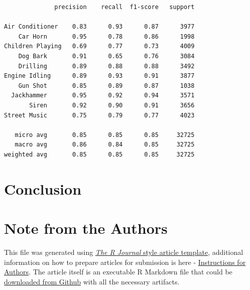\begin{verbatim}
              precision    recall  f1-score   support

Air Conditioner    0.83      0.93      0.87      3977
    Car Horn       0.95      0.78      0.86      1998
Children Playing   0.69      0.77      0.73      4009
    Dog Bark       0.91      0.65      0.76      3084
    Drilling       0.89      0.88      0.88      3492
Engine Idling      0.89      0.93      0.91      3877
    Gun Shot       0.85      0.89      0.87      1038
  Jackhammer       0.95      0.92      0.94      3571
       Siren       0.92      0.90      0.91      3656
Street Music       0.75      0.79      0.77      4023

   micro avg       0.85      0.85      0.85     32725
   macro avg       0.86      0.84      0.85     32725
weighted avg       0.85      0.85      0.85     32725
\end{verbatim}

\hypertarget{conclusion}{%
\section{Conclusion}\label{conclusion}}



\hypertarget{note-from-the-authors}{%
\section{Note from the Authors}\label{note-from-the-authors}}

This file was generated using
\href{https://github.com/rstudio/rticles}{\emph{The R Journal} style
article template}, additional information on how to prepare articles for
submission is here -
\href{https://journal.r-project.org/share/author-guide.pdf}{Instructions
for Authors}. The article itself is an executable R Markdown file that
could be
\href{https://github.com/ivbsoftware/big-data-final-2/blob/master/docs/R_Journal/big-data-final-2/}{downloaded
from Github} with all the necessary artifacts.


\address{%
Vadim Spirkov\\
York University School of Continuing Studies\\
\\
}


\address{%
Murlidhar Loka\\
York University School of Continuing Studies\\
\\
}


